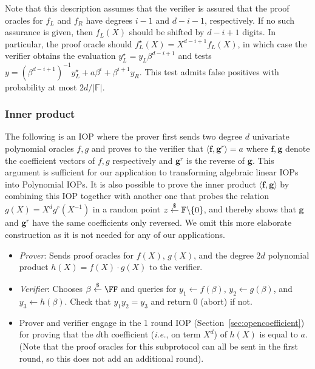 Note that this description assumes that the verifier is assured that the proof oracles for $f_L$ and $f_R$ have degrees $i-1$ and $d-i-1$, respectively. If no such assurance is given, then $f_L(X)$ should be shifted by $d-i+1$ digits. In particular, the proof oracle should $f_L^\star(X) = X^{d-i+1} f_L(X)$, in which case the verifier obtains the evaluation $y_L^\star = y_L \beta^{d-i+1}$ and tests $y = (\beta^{d-i+1})^{-1}y_L^\star + a \beta^i + \beta^{i+1} y_R$. This test admits false positives with probability at most $2d/|\mathbb{F}|$.

\subsubsection{Inner product}\label{sec:innerproduct}
The following is an IOP where the prover first sends two degree $d$ univariate polynomial oracles $f, g$ and proves to the verifier that $\langle \mathbf{f}, \mathbf{g}^r \rangle = a$ where $\mathbf{f}, \mathbf{g}$ denote the coefficient vectors of $f, g$ respectively and $\mathbf{g}^r$ is the reverse of $\mathbf{g}$. This argument is sufficient for our application to transforming algebraic linear IOPs into Polynomial IOPs. It is also possible to prove the inner product $\langle \mathbf{f}, \mathbf{g} \rangle$ by combining this IOP together with another one that probes the relation $g(X) = X^dg^r(X^{-1})$ in a random point $z \overset{\$}{\gets} \mathbb{F} \backslash \{0\}$, and thereby shows that $\mathbf{g}$ and $\mathbf{g}^r$ have the same coefficients only reversed. We omit this more elaborate construction as it is not needed for any of our applications.

\begin{itemize}
\item \emph{Prover}: Sends proof oracles for $f(X)$, $g(X)$, and the degree $2d$ polynomial product $h(X) = f(X)\cdot g(X)$ to the verifier. 
\item \emph{Verifier}: Chooses $\beta \sample \FF$ and queries for $y_1 \leftarrow f(\beta)$, $y_2 \leftarrow g(\beta)$, and $y_3 \leftarrow h(\beta)$. Check that $y_1 y_2 = y_3$ and return $0$ (abort) if not.
\item Prover and verifier engage in the 1 round IOP (Section~\ref{sec:opencoefficient}) for proving that the $d$th coefficient (\emph{i.e.}, on term $X^d$) of $h(X)$ is equal to $a$. (Note that the proof oracles for this subprotocol can all be sent in the first round, so this does not add an additional round). %
\end{itemize}


